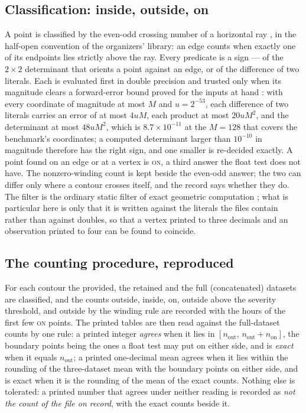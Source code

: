 \documentclass[preprint,11pt,authoryear]{elsarticle}
\begin{document}
\subsection{Classification: inside, outside, on}
A point is classified by the even-odd crossing number of a horizontal ray \citep{shimrat1962,hormann2001}, in the half-open convention of the organizers' library: an edge counts when exactly one of its endpoints lies strictly above the ray. Every predicate is a sign --- of the $2 \times 2$ determinant that orients a point against an edge, or of the difference of two literals. Each is evaluated first in double precision and trusted only when its magnitude clears a forward-error bound proved for the inputs at hand \citep{higham2002,fortune1996}: with every coordinate of magnitude at most $M$ and $u = 2^{-53}$, each difference of two literals carries an error of at most $4uM$, each product at most $20uM^2$, and the determinant at most $48uM^2$, which is $8.7 \times 10^{-11}$ at the $M = 128$ that covers the benchmark's coordinates; a computed determinant larger than $10^{-10}$ in magnitude therefore has the right sign, and one smaller is re-decided exactly. A point found on an edge or at a vertex is \textsc{on}, a third answer the float test does not have. The nonzero-winding count is kept beside the even-odd answer; the two can differ only where a contour crosses itself, and the record says whether they do. The filter is the ordinary static filter of exact geometric computation \citep{fortune1996,shewchuk1997,yap1997}; what is particular here is only that it is written against the literals the files contain rather than against doubles, so that a vertex printed to three decimals and an observation printed to four can be found to coincide.

\subsection{The counting procedure, reproduced}\label{sec:rule}
For each contour the provided, the retained and the full (concatenated) datasets are classified, and the counts outside, inside, on, outside above the severity threshold, and outside by the winding rule are recorded with the hours of the first few \textsc{on} points. The printed tables are then read against the full-dataset counts by one rule: a printed integer \emph{agrees} when it lies in $[n_{\mathrm{out}},\, n_{\mathrm{out}} + n_{\mathrm{on}}]$, the boundary points being the ones a float test may put on either side, and is \emph{exact} when it equals $n_{\mathrm{out}}$; a printed one-decimal mean agrees when it lies within the rounding of the three-dataset mean with the boundary points on either side, and is exact when it is the rounding of the mean of the exact counts. Nothing else is tolerated: a printed number that agrees under neither reading is recorded as \emph{not the count of the file on record}, with the exact counts beside it.
\end{document}
